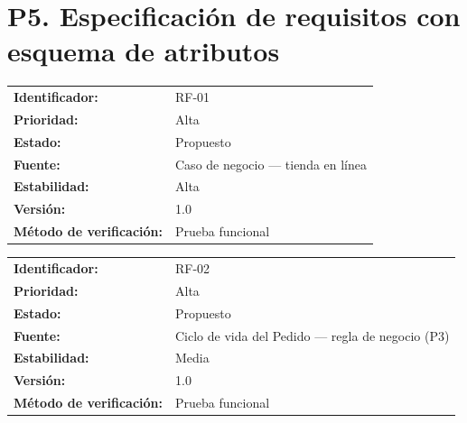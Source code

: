 \documentclass{article}
\begin{document}
\section{P5. Especificación de requisitos con esquema de atributos}
\begin{tcolorbox}[colback=white, colframe=black, boxrule=0.5pt, sharp corners, 
  title={}, breakable]

\medskip
\begin{tabular}{@{}ll@{}}
\textbf{Identificador:}           & RF-01 \\
\textbf{Prioridad:}               & Alta \\
\textbf{Estado:}                  & Propuesto \\
\textbf{Fuente:}                  & Caso de negocio — tienda en línea \\
\textbf{Estabilidad:}             & Alta \\
\textbf{Versión:}                 & 1.0 \\
\textbf{Método de verificación:}  & Prueba funcional \\
\end{tabular}
\end{tcolorbox}

\medskip

\begin{tcolorbox}[colback=white, colframe=black, boxrule=0.5pt, sharp corners, 
  title={}, breakable]

\medskip
\begin{tabular}{@{}ll@{}}
\textbf{Identificador:}           & RF-02 \\
\textbf{Prioridad:}               & Alta \\
\textbf{Estado:}                  & Propuesto \\
\textbf{Fuente:}                  & Ciclo de vida del Pedido — regla de negocio (P3) \\
\textbf{Estabilidad:}             & Media \\
\textbf{Versión:}                 & 1.0 \\
\textbf{Método de verificación:}  & Prueba funcional \\
\end{tabular}
\end{tcolorbox}
\end{document}
